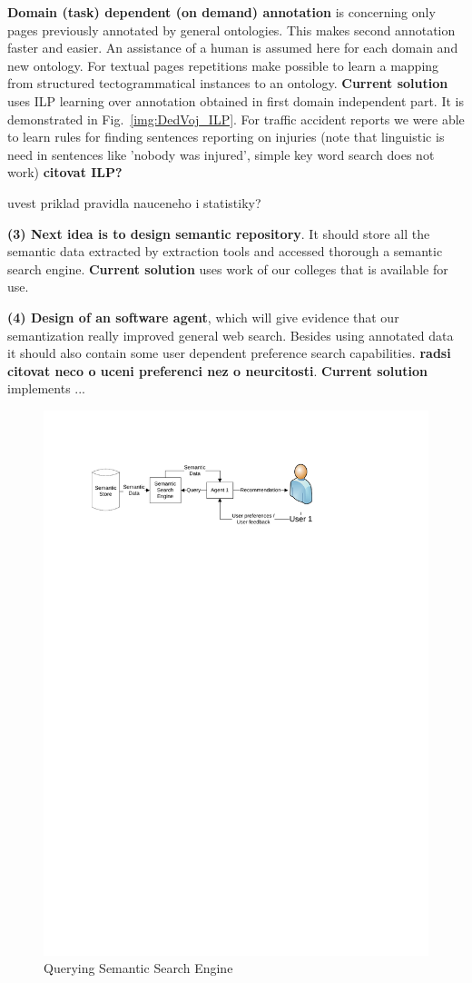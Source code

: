 \documentclass{www2009-submission}
\begin{document}
\textbf{Domain (task) dependent (on demand) annotation} is concerning only pages previously annotated by general ontologies. This makes second annotation faster and easier. An assistance of a human is assumed here for each domain and new ontology. For textual pages repetitions make possible to learn a mapping from structured tectogrammatical instances to an ontology. %
{\bf Current solution} uses ILP learning over annotation obtained in first domain independent part. It is demonstrated in Fig.~\ref{img:DedVoj_ILP}. For traffic accident reports we were able to learn rules for finding sentences reporting on injuries (note that linguistic is need in sentences like 'nobody was injured', simple key word search does not work) {\bf citovat ILP?}

uvest priklad pravidla nauceneho i statistiky?

\textbf{(3) Next idea is to design semantic repository}. It should store all the semantic data extracted by extraction tools and accessed thorough a semantic search engine. 
{\bf Current solution} uses work of our colleges \cite{biblio:DoTySemanticWeb2007} that is available for use.


\textbf{(4) Design of an software agent}, which will give evidence that our semantization really improved general web search. Besides using annotated data it should also contain some user dependent preference search capabilities. {\bf radsi citovat neco o uceni preferenci nez o neurcitosti}. {\bf Current solution} implements ...


\begin{figure}
\centering
\includegraphics[width=\hsize, height=.3\hsize]{img/UserSearch}
\caption{Querying Semantic Search Engine}
\label{img:UserSearch}
\end{figure}
 
\end{document}
